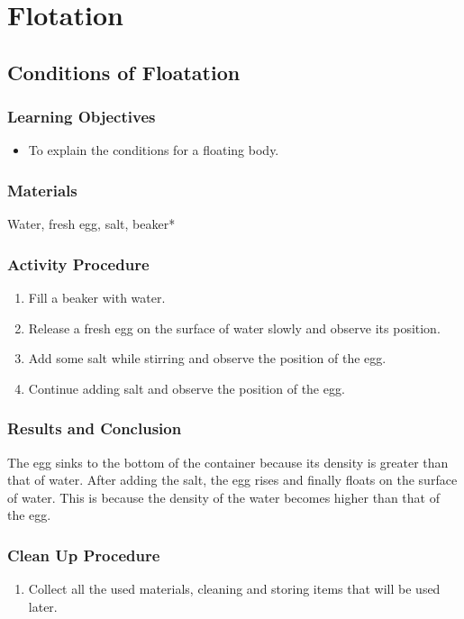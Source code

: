 \section{Flotation}

\subsection{Conditions of Floatation}

\subsubsection*{Learning Objectives}
\begin{itemize}
\item{To explain the conditions for a floating body.} 
\end{itemize}

\subsubsection*{Materials}
Water, fresh egg, salt, beaker*

\subsubsection*{Activity Procedure}
\begin{enumerate}
\item{Fill a beaker with water.} 
\item{Release a fresh egg on the surface of water slowly and observe its position.} 
\item{Add some salt while stirring and observe the position of the egg.} 
\item{Continue adding salt and observe the position of the egg.} 
\end{enumerate}

\subsubsection*{Results and Conclusion}
The egg sinks to the bottom of the container because its density is greater than that of water. After adding the salt, the egg rises and finally floats on the surface of water. This is because the density of the water becomes higher than that of the egg.  

\subsubsection*{Clean Up Procedure}
\begin{enumerate}
\item{Collect all the used materials, cleaning and storing items that will be used later.} 
\end{enumerate}

